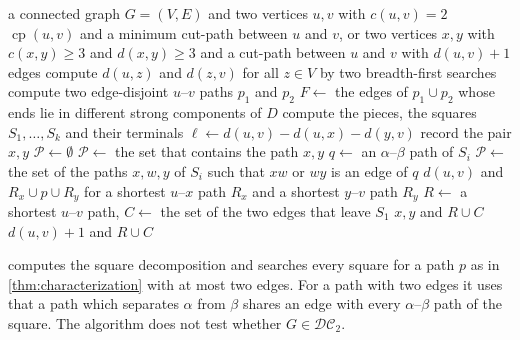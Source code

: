 \documentclass[pdflatex,sn-mathphys-num]{sn-jnl}%
\theoremstyle{thmstyleone}%
\theoremstyle{thmstyletwo}%
\theoremstyle{thmstylethree}%
\newcommand{\cp}{\operatorname{cp}}%
\newcommand{\DC}{\mathcal{DC}_2}%
\begin{document}
\begin{algorithm}[tb]
\caption{A minimum cut-path if $c(u, v) = 2$, or two vertices that show $G \notin \DC$}
\label{alg:cut-two}
\begin{algorithmic}[1]
\Require a connected graph $G = (V, E)$ and two vertices $u, v$ with $c(u, v) = 2$
\Ensure $\cp(u, v)$ and a minimum cut-path between $u$ and $v$, or two vertices $x, y$ with $c(x, y) \geq 3$ and $d(x, y) \geq 3$ and a cut-path between $u$ and $v$ with $d(u, v) + 1$ edges
\State compute $d(u, z)$ and $d(z, v)$ for all $z \in V$ by two breadth-first searches \label{line:bfs}
\State compute two edge-disjoint $u$--$v$ paths $p_1$ and $p_2$ \label{line:paths}
\State $F \gets$ the edges of $p_1 \cup p_2$ whose ends lie in different strong components of $D$ \label{line:residual}
\State compute the pieces, the squares $S_1, \dots, S_k$ and their terminals \label{line:pieces}
 \label{line:loop}
        \State $\ell \gets d(u, v) - d(u, x) - d(y, v)$ \label{line:length}
            \State record the pair $x, y$  \label{line:record}
        \EndIf
        \State $\mathcal{P} \gets \emptyset$
            \State $\mathcal{P} \gets$ the set that contains the path $x, y$ \label{line:edge}
            \State $q \gets$ an $\alpha$--$\beta$ path of $S_i$ \label{line:q}
            \State $\mathcal{P} \gets$ the set of the paths $x, w, y$ of $S_i$ such that $xw$ or $wy$ is an edge of $q$ \label{line:candidates}
        \EndIf
             \label{line:test}
                \State \Return $d(u, v)$ and $R_x \cup p \cup R_y$ for a shortest $u$--$x$ path $R_x$ and a shortest $y$--$v$ path $R_y$ \label{line:found}
            \EndIf
        \EndFor
    \EndFor
\EndFor
\State $R \gets$ a shortest $u$--$v$ path, $C \gets$ the set of the two edges that leave $S_1$ \label{line:union}
    \State \Return $x, y$ and $R \cup C$ \label{line:certificate}
\EndIf
\State \Return $d(u, v) + 1$ and $R \cup C$ \label{line:not-found}
\end{algorithmic}
\end{algorithm}

 computes the square decomposition and searches every square for a path $p$ as in \cref{thm:characterization} with at most two edges.
For a path with two edges it uses that a path which separates $\alpha$ from $\beta$ shares an edge with every $\alpha$--$\beta$ path of the square.
The algorithm does not test whether $G \in \DC$.
\end{document}
